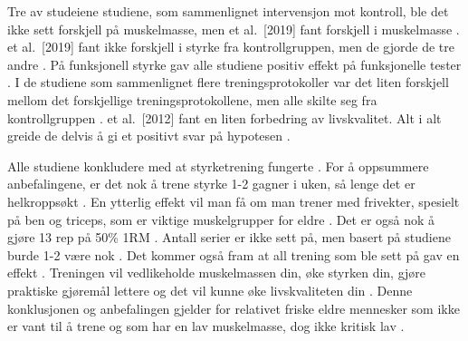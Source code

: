 \documentclass[
]{book}
\begin{document}
Tre av studeiene studiene, som sammenlignet intervensjon mot kontroll, ble det ikke sett forskjell på muskelmasse, men \citet{vikberg} et al.~{[}2019{]} fant forskjell i muskelmasse \citetext{\citealp[Johnen, and Holfelder 2019]{Schott}; \citealp[ et al.~2017]{Turpela}; \citealp[ et al.~2002]{vincent}}.
\citet{vikberg} et al.~{[}2019{]} fant ikke forskjell i styrke fra kontrollgruppen, men de gjorde de tre andre \citetext{\citealp[Johnen, and Holfelder 2019]{Schott}; \citealp[ et al.~2017]{Turpela}; \citealp[ et al.~2002]{vincent}}.
På funksjonell styrke gav alle studiene positiv effekt på funksjonelle tester \citetext{\citealp[ et al.~2012]{Geirsdottir}; \citealp[Johnen, and Holfelder 2019]{Schott}; \citealp[ et al.~2017]{Turpela}; \citealp[ et al.~\href{mailto:2019;@vincent}{\nolinkurl{2019;@vincent}} et al.~2002]{vikberg}}.
I de studiene som sammenlignet flere treningsprotokoller var det liten forskjell mellom det forskjellige treningsprotokollene, men alle skilte seg fra kontrollgruppen \citetext{\citealp[Johnen, and Holfelder 2019]{Schott}; \citealp[ et al.~2017]{Turpela}; \citealp[ et al.~2019]{vikberg}; \citealp[ et al.~2002]{vincent}}.
\citet{Geirsdottir} et al.~{[}2012{]} fant en liten forbedring av livskvalitet.
Alt i alt greide de delvis å gi et positivt svar på hypotesen \citetext{\citealp[ et al.~2012]{Geirsdottir}; \citealp[Johnen, and Holfelder 2019]{Schott}; \citealp[ et al.~2017]{Turpela}; \citealp[ et al.~2019]{vikberg}; \citealp[ et al.~2002]{vincent}}.

Alle studiene konkludere med at styrketrening fungerte \citetext{\citealp[ et al.~2012]{Geirsdottir}; \citealp[Johnen, and Holfelder 2019]{Schott}; \citealp[ et al.~2017]{Turpela}; \citealp[ et al.~2019]{vikberg}; \citealp[ et al.~2002]{vincent}}.
For å oppsummere anbefalingene, er det nok å trene styrke 1-2 gagner i uken, så lenge det er helkroppsøkt \citetext{\citealp[ et al.~2017]{Turpela}; \citealp[ et al.~2019]{vikberg}}.
En ytterlig effekt vil man få om man trener med frivekter, spesielt på ben og triceps, som er viktige muskelgrupper for eldre \citep[Johnen, and Holfelder 2019]{Schott}.
Det er også nok å gjøre 13 rep på 50\% 1RM \citep[ et al.~2002]{vincent}.
Antall serier er ikke sett på, men basert på studiene burde 1-2 være nok \citetext{\citealp[ et al.~2012]{Geirsdottir}; \citealp[Johnen, and Holfelder 2019]{Schott}; \citealp[ et al.~2017]{Turpela}}.
Det kommer også fram at all trening som ble sett på gav en effekt \citetext{\citealp[ et al.~2012]{Geirsdottir}; \citealp[Johnen, and Holfelder 2019]{Schott}; \citealp[ et al.~2017]{Turpela}; \citealp[ et al.~2019]{vikberg}; \citealp[ et al.~2002]{vincent}}.
Treningen vil vedlikeholde muskelmassen din, øke styrken din, gjøre praktiske gjøremål lettere og det vil kunne øke livskvaliteten din \citetext{\citealp[ et al.~2012]{Geirsdottir}; \citealp[Johnen, and Holfelder 2019]{Schott}; \citealp[ et al.~2017]{Turpela}; \citealp[ et al.~2019]{vikberg}; \citealp[ et al.~2002]{vincent}}.
Denne konklusjonen og anbefalingen gjelder for relativet friske eldre mennesker som ikke er vant til å trene og som har en lav muskelmasse, dog ikke kritisk lav \citetext{\citealp[ et al.~2012]{Geirsdottir}; \citealp[Johnen, and Holfelder 2019]{Schott}; \citealp[ et al.~2017]{Turpela}; \citealp[ et al.~2019]{vikberg}; \citealp[ et al.~2002]{vincent}}.
\end{document}
